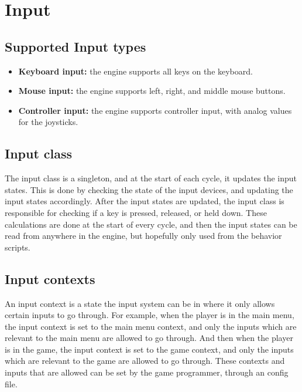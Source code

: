 \section{Input}
\label{sec:input}
\subsection{Supported Input types}
\begin{itemize}
    \item \textbf{Keyboard input:} the engine supports all keys on the keyboard.
    \item \textbf{Mouse input:} the engine supports left, right, and middle mouse buttons.
    \item \textbf{Controller input:} the engine supports controller input, with analog values for the joysticks.
\end{itemize}

\subsection{Input class}
The input class is a singleton, and at the start of each cycle, it updates the input states.
This is done by checking the state of the input devices, and updating the input states accordingly.
After the input states are updated, the input class is responsible for checking if a key is pressed, released, or held down.
These calculations are done at the start of every cycle, and then the input states can be read from anywhere in the engine, but hopefully only used from the behavior scripts.

\subsection{Input contexts}
An input context is a state the input system can be in where it only allows certain inputs to go through.
For example, when the player is in the main menu, the input context is set to the main menu context, and only the inputs which are relevant to the main menu are allowed to go through.
And then when the player is in the game, the input context is set to the game context, and only the inputs which are relevant to the game are allowed to go through.
These contexts and inputs that are allowed can be set by the game programmer, through an config file.